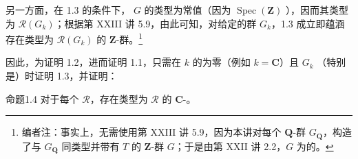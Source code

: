 另一方面，在 1.3 的条件下， $G$ 的类型为常值（因为 $\operatorname{Spec}(\mathbf Z)$ ），因而其类型为 $\mathcal R(G_k)$；根据第 XXIII 讲 5.9，由此可知，对给定的群 $G_k$，1.3 成立即蕴涵存在类型为 $\mathcal R(G_k)$ 的 $\mathbf Z$-群。\footnote{编者注：事实上，无需使用第 XXIII 讲 5.9，因为本讲对每个 $\mathbf Q$-群 $G_{\mathbf Q}$，构造了与 $G_{\mathbf Q}$ 同类型并带有 $T$ 的 $\mathbf Z$-群 $G$；于是由第 XXII 讲 2.2，$G$ 为的。}

因此，为证明 1.2，进而证明 1.1，只需在 $k$ 的为零（例如 $k=\mathbf C$）且 $G_k$ （特别是）时证明 1.3，并证明：
\begin{SGAresult}{命题}{1.4}
对于每个 $\mathcal R$，存在类型为 $\mathcal R$ 的 $\mathbf C$-。
\end{SGAresult}
